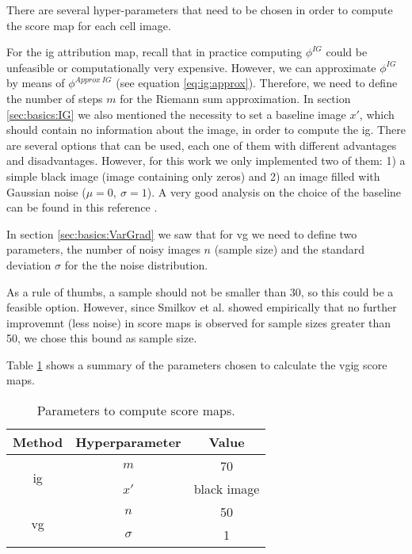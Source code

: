 
\glsresetall
\graphicspath{{./Sections/Methodology/Resources/}}

There are several hyper-parameters that need to be chosen in order to compute the score map for each cell image.

For the \gls{ig} attribution map, recall that in practice computing $\phi^{IG}$ could be unfeasible or computationally very expensive. However, we can approximate $\phi^{IG}$ by means of $\phi^{Approx\ IG}$ (see equation \ref{eq:ig:approx}). Therefore, we need to define the number of steps $m$ for the Riemann sum approximation. In section \ref{sec:basics:IG} we also mentioned the necessity to set a baseline image $x'$, which should contain no information about the image, in order to compute the \gls{ig}. There are several options that can be used, each one of them with different advantages and disadvantages. However, for this work we only implemented two of them: 1) a simple black image (image containing only zeros) and 2) an image filled with Gaussian noise ($\mu=0,\ \sigma=1$). A very good analysis on the choice of the baseline can be found in this reference \cite{sturmfels2020visualizing}.

In section \ref{sec:basics:VarGrad} we saw that for \gls{vg} we need to define two parameters, the number of noisy images $n$ (sample size) and the standard deviation $\sigma$ for the the noise distribution.

As a rule of thumbs, a sample should not be smaller than 30, so this could be a feasible option. However, since Smilkov et al. \cite{Smilkov_smoothgrad} showed empirically that no further improvemnt (less noise) in score maps is observed for sample sizes greater than 50, we chose this bound as sample size.

Table \ref{table:VGIG_exp_set:params} shows a summary of the parameters chosen to calculate the \gls{vgig} score maps.

\begin{table}[!ht]
  \centering
  \begin{tabular}{c|c|c}
    \hline
    Method & Hyperparameter & Value \\
    \hline
    \multirow{2}{*}{\gls{ig}} & $m$ & 70 \\
    \cline{2-3}
     & $x'$ & black image \\
    \hline
    \multirow{2}{*}{\gls{vg}} & $n$ & 50 \\
    \cline{2-3}
     & $\sigma$ & 1 \\
    \hline
  \end{tabular}
  \caption{Parameters to compute score maps.}
  \label{table:VGIG_exp_set:params}
\end{table}

